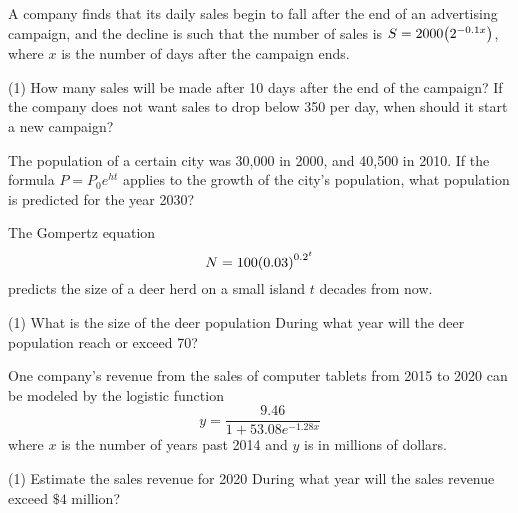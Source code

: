 \documentclass[../mathNotesPreamble]{subfiles}
\begin{document}
    \begin{ex*}
      A company finds that its daily sales begin to fall after the end of an advertising campaign, and the decline is such that the number of sales is $S=2000{\left(2^{-0.1x}\right)}$, where $x$ is the number of days after the campaign ends.
    \end{ex*}
    \begin{extasks}[after-item-skip=\stretch{0.5}](1)
      \task How many sales will be made after 10 days after the end of the campaign?
      \task If the company does not want sales to drop below 350 per day, when should it start a new campaign?
    \end{extasks}
    \pagebreak
    
    \begin{ex*}
      The population of a certain city was 30,000 in 2000, and 40,500 in 2010. If the formula $P=P_0e^{ht}$ applies to the growth of the city's population, what population is predicted for the year 2030?
    \end{ex*}
    \pagebreak
    
    \begin{ex*}
      The Gompertz equation
        \[N=100{\left(0.03\right)}^{0.2^t}\]
      predicts the size of a deer herd on a small island $t$ decades from now. 
    \end{ex*}
    \begin{extasks}[after-item-skip=\stretch{1}](1)
      \task What is the size of the deer population
      \task During what year will the deer population reach or exceed 70?
    \end{extasks}
    \pagebreak
    
    \begin{ex*}
      One company's revenue from the sales of computer tablets from 2015 to 2020 can be modeled by the logistic function
        \[y=\frac{9.46}{1+53.08e^{-1.28x}}\]
      where $x$ is the number of years past 2014 and $y$ is in millions of dollars.
    \end{ex*}
    \begin{extasks}[after-item-skip=\stretch{1}](1)
      \task Estimate the sales revenue for 2020
      \task During what year will the sales revenue exceed $\$4$ million?
    \end{extasks}

  \pagebreak
\end{document}
